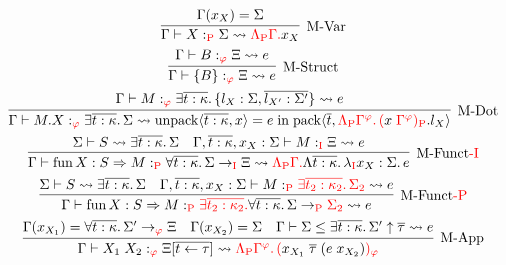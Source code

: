 \begin{gather*}
  \infer[\text{M-Var}]{\Gamma \vdash X:_{\textcolor{red}{\symP}} \Sigma \elaborate \textcolor{red}{\Lambda_\symP \Gamma\ldotp} x_X}{
    \Gamma(x_X) = \Sigma
  }
  \\
  \infer[\text{M-Struct}]{\Gamma \vdash \{B\}:_{\textcolor{red}{\varphi}} \Xi \elaborate e}{
    \Gamma \vdash B:_{\textcolor{red}{\varphi}} \Xi \elaborate e
  }
  \\
  \infer[\text{M-Dot}]{\Gamma \vdash M.X:_{\textcolor{red}{\varphi}} \exists \overline{t: \kappa}\ldotp \Sigma \elaborate \symunpack\langle \overline{t: \kappa}, x\rangle = e \symin \sympack\langle \overline{t},\textcolor{red}{\Lambda_\symP \Gamma^\varphi\ldotp (}x\; \textcolor{red}{\Gamma^\varphi)_\symP} .l_X\rangle}{
    \Gamma \vdash M:_{\textcolor{red}{\varphi}} \exists \overline{t: \kappa}\ldotp \{l_X: \Sigma, \overline{l_{X'}: \Sigma'}\} \elaborate e
  }
  \\
  \infer[\text{M-Funct\textcolor{red}{-I}}]{\Gamma \vdash \symfun X: S \Rightarrow M:_{\textcolor{red}{\symP}} \forall \overline{t: \kappa}\ldotp \Sigma \to_{\textcolor{red}{\symI}} \Xi \elaborate \textcolor{red}{\Lambda_\symP \Gamma\ldotp} \Lambda \overline{t: \kappa}\ldotp \lambda_{\textcolor{red}{\symI}} x_X: \Sigma\ldotp e}{
    \Sigma \vdash S \elaborate \exists \overline{t: \kappa}\ldotp \Sigma
    &
    \Gamma, \overline{t: \kappa}, x_X: \Sigma \vdash M:_{\textcolor{red}{\symI}} \Xi \elaborate e
  }
  \\
  \infer[\text{M-Funct\textcolor{red}{-P}}]{\Gamma \vdash \symfun X: S \Rightarrow M:_{\textcolor{red}{\symP}} \textcolor{red}{\exists \overline{t_2: \kappa_2}\ldotp} \forall \overline{t: \kappa}\ldotp \Sigma \to_{\textcolor{red}{\symP}} \textcolor{red}{\Sigma_2} \elaborate e}{
    \Sigma \vdash S \elaborate \exists \overline{t: \kappa}\ldotp \Sigma
    &
    \Gamma, \overline{t: \kappa}, x_X: \Sigma \vdash M:_{\textcolor{red}{\symP}} \textcolor{red}{\exists \overline{t_2: \kappa_2}\ldotp \Sigma_2} \elaborate e
  }
  \\
  \infer[\text{M-App}]{\Gamma \vdash X_1\; X_2:_{\textcolor{red}{\varphi}} \Xi[\overline{t \assign \tau}] \elaborate \textcolor{red}{\Lambda_\symP \Gamma^\varphi\ldotp (} x_{X_1}\; \overline{\tau}\; (e\; x_{X_2})\textcolor{red}{)_\varphi}}{
    \Gamma(x_{X_1}) = \forall \overline{t: \kappa}\ldotp \Sigma' \to_{\textcolor{red}{\varphi}} \Xi
    &
    \Gamma(x_{X_2}) = \Sigma
    &
    \Gamma \vdash \Sigma \leq \exists\overline{t: \kappa}\ldotp \Sigma' \uparrow \overline{\tau} \elaborate e
  }
  \\

\end{gather*}

